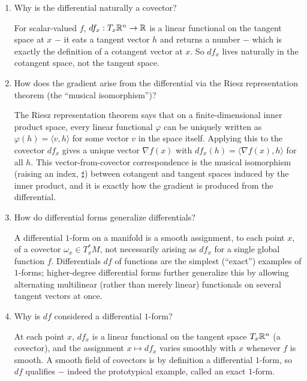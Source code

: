 \documentclass{essay}
\begin{document}
\begin{enumerate}[resume, leftmargin=*, itemsep=8pt]
\item Why is the differential naturally a covector?
\begin{answer}
For scalar-valued \(f\), \(df_x:T_x\mathbb{R}^n\to\mathbb{R}\) is a linear functional on the tangent space at \(x\) \(-\) it eats a tangent vector \(h\) and returns a number \(-\) which is exactly the definition of a cotangent vector at \(x\). So \(df_x\) lives naturally in the cotangent space, not the tangent space.
\end{answer}

\item How does the gradient arise from the differential via the Riesz representation theorem (the ``musical isomorphism'')?
\begin{answer}
The Riesz representation theorem says that on a finite-dimensional inner product space, every linear functional \(\varphi\) can be uniquely written as \(\varphi(h)=\langle v,h\rangle\) for some vector \(v\) in the space itself. Applying this to the covector \(df_x\) gives a unique vector \(\nabla f(x)\) with \(df_x(h)=\langle\nabla f(x),h\rangle\) for all \(h\). This vector-from-covector correspondence is the musical isomorphism (raising an index, \(\sharp\)) between cotangent and tangent spaces induced by the inner product, and it is exactly how the gradient is produced from the differential.
\end{answer}

\item How do differential forms generalize differentials?
\begin{answer}
A differential \(1\)-form on a manifold is a smooth assignment, to each point \(x\), of a covector \(\omega_x\in T_x^*M\), not necessarily arising as \(df_x\) for a single global function \(f\). Differentials \(df\) of functions are the simplest (``exact'') examples of \(1\)-forms; higher-degree differential forms further generalize this by allowing alternating multilinear (rather than merely linear) functionals on several tangent vectors at once.
\end{answer}

\item Why is \(df\) considered a differential \(1\)-form?
\begin{answer}
At each point \(x\), \(df_x\) is a linear functional on the tangent space \(T_x\mathbb{R}^n\) (a covector), and the assignment \(x\mapsto df_x\) varies smoothly with \(x\) whenever \(f\) is smooth. A smooth field of covectors is by definition a differential \(1\)-form, so \(df\) qualifies \(-\) indeed the prototypical example, called an exact \(1\)-form.
\end{answer}


\end{enumerate}
\end{document}
